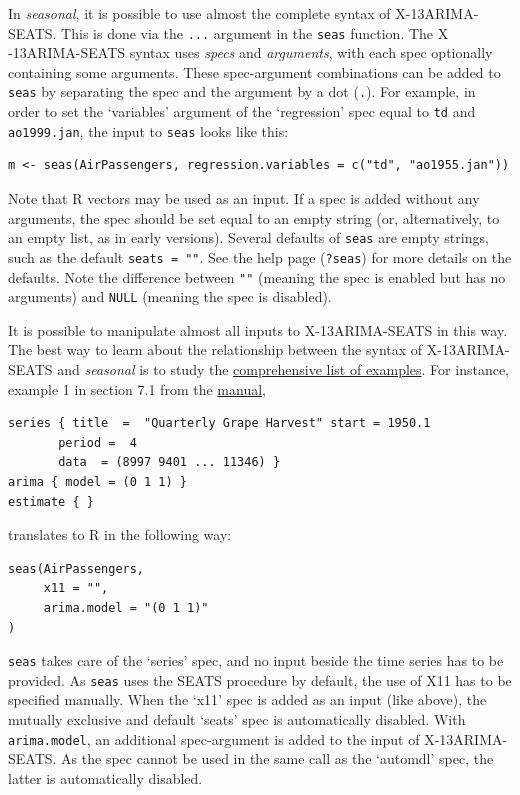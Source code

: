 In \emph{seasonal}, it is possible to use almost the complete syntax of
X-13ARIMA- SEATS. This is done via the \texttt{...} argument in the
\texttt{seas} function. The X -13ARIMA-SEATS syntax uses \emph{specs}
and \emph{arguments}, with each spec optionally containing some
arguments. These spec-argument combinations can be added to
\texttt{seas} by separating the spec and the argument by a dot
(\texttt{.}). For example, in order to set the `variables' argument of
the `regression' spec equal to \texttt{td} and \texttt{ao1999.jan}, the
input to \texttt{seas} looks like this:

\begin{verbatim}
m <- seas(AirPassengers, regression.variables = c("td", "ao1955.jan"))
\end{verbatim}

Note that R vectors may be used as an input. If a spec is added without
any arguments, the spec should be set equal to an empty string (or,
alternatively, to an empty list, as in early versions). Several defaults
of \texttt{seas} are empty strings, such as the default
\texttt{seats = ""}. See the help page (\texttt{?seas}) for more details
on the defaults. Note the difference between \texttt{""} (meaning the
spec is enabled but has no arguments) and \texttt{NULL} (meaning the
spec is disabled).

It is possible to manipulate almost all inputs to X-13ARIMA-SEATS in
this way. The best way to learn about the relationship between the
syntax of X-13ARIMA- SEATS and \emph{seasonal} is to study the
\href{http://www.seasonal.website/examples.html}{comprehensive list of
examples}. For instance, example 1 in section 7.1 from the
\href{http://www.census.gov/ts/x13as/docX13ASHTML.pdf}{manual},

\begin{verbatim}
series { title  =  "Quarterly Grape Harvest" start = 1950.1
       period =  4
       data  = (8997 9401 ... 11346) }
arima { model = (0 1 1) }
estimate { }
\end{verbatim}

translates to R in the following way:

\begin{verbatim}
seas(AirPassengers,
     x11 = "",
     arima.model = "(0 1 1)"
)
\end{verbatim}

\texttt{seas} takes care of the `series' spec, and no input beside the
time series has to be provided. As \texttt{seas} uses the SEATS
procedure by default, the use of X11 has to be specified manually. When
the `x11' spec is added as an input (like above), the mutually exclusive
and default `seats' spec is automatically disabled. With
\texttt{arima.model}, an additional spec-argument is added to the input
of X-13ARIMA-SEATS. As the spec cannot be used in the same call as the
`automdl' spec, the latter is automatically disabled.

